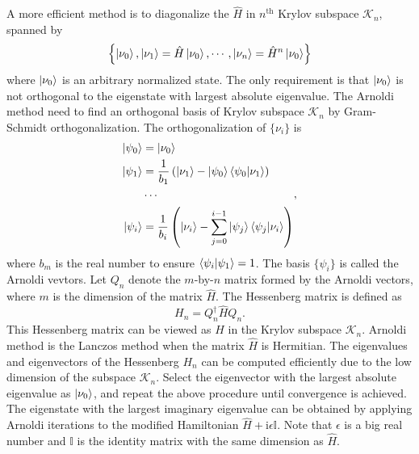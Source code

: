 \documentclass[longbibliography, aps, prx, amsmath, amssymb, amsfonts, twocolumn,superscriptaddress, footinbib]{revtex4-1}
\begin{document}
	A more efficient method is to diagonalize the $\hat{H}$ in $n^{\text{th}}$ Krylov subspace $\mathcal{K}_n$, spanned by
	\begin{equation}
		\left\{ \ket{\nu_0}, \ket{\nu_1}=\hat{H}\ket{\nu_0},\cdots,\ket{\nu_n}=\hat{H}^n\ket{\nu_0}\right\}
	\end{equation}
	where $\ket{\nu_0}$ is an arbitrary normalized state. The only requirement is that $\ket{\nu_0}$ is not orthogonal to the eigenstate with largest absolute eigenvalue. 
	The Arnoldi method need to find an orthogonal basis of Krylov subspace $\mathcal{K}_n$ by Gram-Schmidt orthogonalization. %
	The orthogonalization of $\{\nu_i\}$ is 
	\begin{equation}
		\begin{split}
			\ket{\psi_0} &= \ket{\nu_0}\\
			\ket{\psi_1} &= \frac{1}{b_1}\left(\ket{\nu_1} - \ket{\psi_0} \bra{\psi_0} \ket{\nu_1}\right)\\
			&\cdots\\
			\ket{\psi_i} &= \frac{1}{b_i}\left(\ket{\nu_i} - \sum_{j=0}^{i-1} \ket{\psi_j} \bra{\psi_j} \ket{\nu_i}\right)
		\end{split},			
	\end{equation}
	where $b_m$ is the real number to ensure $\bra{\psi_i}\ket{\psi_1}=1$. The basis $\{ \psi_i \}$ is called the Arnoldi vevtors. Let $Q_n$ denote the $m$-by-$n$ matrix formed by the Arnoldi vectors, where $m$ is the dimension of the matrix $\hat{H}$. The Hessenberg matrix is defined as 
	\begin{equation}
		H_n = Q_n^{\dagger} \hat{H} Q_n.
	\end{equation}
	This Hessenberg matrix can be viewed as $\hat{H}$ in the Krylov subspace $\mathcal{K}_n$. 
	Arnoldi method is the Lanczos method when the matrix $\hat{H}$ is Hermitian.
	The eigenvalues and eigenvectors of the Hessenberg $H_n$ can be computed efficiently due to the low dimension of the subspace $\mathcal{K}_n$. Select the eigenvector with the largest absolute eigenvalue as $\ket{\nu_0}$, and repeat the above procedure until convergence is achieved. The eigenstate with the largest imaginary eigenvalue can be obtained by applying Arnoldi iterations to the modified Hamiltonian $\hat{H} + \mathrm{i} \epsilon \mathbb{I}$. Note that $\epsilon$ is a big real number and $\mathbb{I}$ is the identity matrix with the same dimension as $\hat{H}$.

\end{document}
